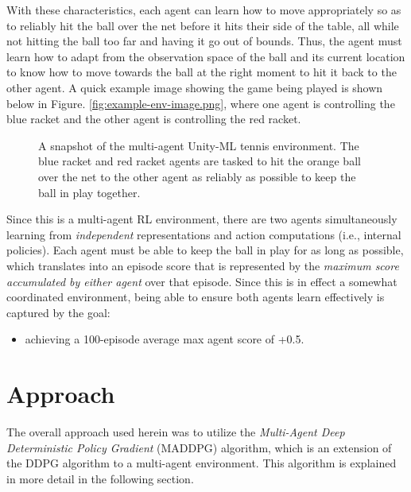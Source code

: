 \documentclass[11pt]{article}
\begin{document}
	\FloatBarrier
	
	With these characteristics, each agent can learn how to move appropriately so as to reliably hit the ball over the net before it hits their side of the table, all while not hitting the ball too far and having it go out of bounds. Thus, the agent must learn how to adapt from the observation space of the ball and its current location to know how to move towards the ball at the right moment to hit it back to the other agent. A quick example image showing the game being played is shown below in Figure. \ref{fig:example-env-image.png}, where one agent is controlling the blue racket and the other agent is controlling the red racket.
	
	\begin{figure}[!ht]
		\centering
		\caption{A snapshot of the multi-agent Unity-ML tennis environment. The blue racket and red racket agents are tasked to hit the orange ball over the net to the other agent as reliably as possible to keep the ball in play together.}
		\label{fig:example-game-image}
	\end{figure}
	
	\FloatBarrier
	
	Since this is a multi-agent RL environment, there are two agents simultaneously learning from \textit{independent} representations and action computations (i.e., internal policies). Each agent must be able to keep the ball in play for as long as possible, which translates into an episode score that is represented by the \textit{maximum score accumulated by either agent} over that episode. Since this is in effect a somewhat coordinated environment, being able to ensure both agents learn effectively is captured by the goal:
	\begin{itemize}
		\item achieving a 100-episode average max agent score of +0.5.
	\end{itemize}
	
	\section{Approach}
	
	The overall approach used herein was to utilize the \textit{Multi-Agent Deep Deterministic Policy Gradient} (MADDPG) algorithm, which is an extension of the DDPG algorithm to a multi-agent environment. This algorithm is explained in more detail in the following section.
	
\end{document}
